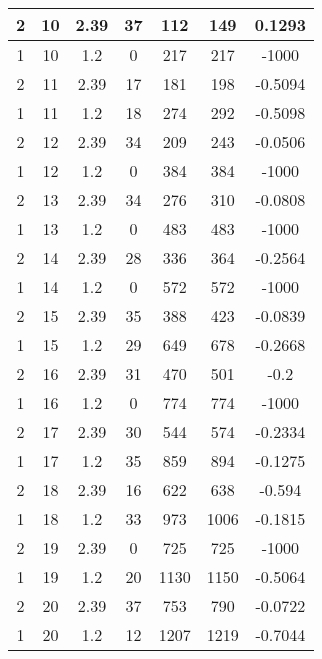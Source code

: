 \documentclass[letterpaper, 12pt]{article}
\begin{document}
\begin{longtable}{|c|c|c|c|c|c|c|}
\hline
2 & 10 & 2.39 & 37 & 112 & 149 & 0.1293 \\
\hline
1 & 10 & 1.2 & 0 & 217 & 217 & -1000 \\
\hline
2 & 11 & 2.39 & 17 & 181 & 198 & -0.5094 \\
\hline
1 & 11 & 1.2 & 18 & 274 & 292 & -0.5098 \\
\hline
2 & 12 & 2.39 & 34 & 209 & 243 & -0.0506 \\
\hline
1 & 12 & 1.2 & 0 & 384 & 384 & -1000 \\
\hline
2 & 13 & 2.39 & 34 & 276 & 310 & -0.0808 \\
\hline
1 & 13 & 1.2 & 0 & 483 & 483 & -1000 \\
\hline
2 & 14 & 2.39 & 28 & 336 & 364 & -0.2564 \\
\hline
1 & 14 & 1.2 & 0 & 572 & 572 & -1000 \\
\hline
2 & 15 & 2.39 & 35 & 388 & 423 & -0.0839 \\
\hline
1 & 15 & 1.2 & 29 & 649 & 678 & -0.2668 \\
\hline
2 & 16 & 2.39 & 31 & 470 & 501 & -0.2 \\
\hline
1 & 16 & 1.2 & 0 & 774 & 774 & -1000 \\
\hline
2 & 17 & 2.39 & 30 & 544 & 574 & -0.2334 \\
\hline
1 & 17 & 1.2 & 35 & 859 & 894 & -0.1275 \\
\hline
2 & 18 & 2.39 & 16 & 622 & 638 & -0.594 \\
\hline
1 & 18 & 1.2 & 33 & 973 & 1006 & -0.1815 \\
\hline
2 & 19 & 2.39 & 0 & 725 & 725 & -1000 \\
\hline
1 & 19 & 1.2 & 20 & 1130 & 1150 & -0.5064 \\
\hline
2 & 20 & 2.39 & 37 & 753 & 790 & -0.0722 \\
\hline
1 & 20 & 1.2 & 12 & 1207 & 1219 & -0.7044 \\
\hline
\end{longtable}
\end{document}
